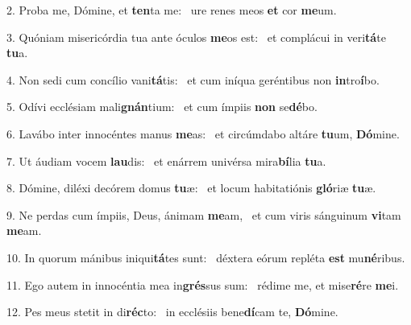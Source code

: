 2. Proba me, Dómine, et \textbf{ten}ta me: \ast\  ure renes meos \textbf{et} cor \textbf{me}um.\

3. Quóniam misericórdia tua ante óculos \textbf{me}os est: \ast\  et complácui in veri\textbf{tá}te \textbf{tu}a.\

4. Non sedi cum concílio vani\textbf{tá}tis: \ast\  et cum iníqua geréntibus non \textbf{in}tro\textbf{í}bo.\

5. Odívi ecclésiam mali\textbf{gnán}tium: \ast\  et cum ímpiis \textbf{non} se\textbf{dé}bo.\

6. Lavábo inter innocéntes manus \textbf{me}as: \ast\  et circúmdabo altáre \textbf{tu}um, \textbf{Dó}mine.\

7. Ut áudiam vocem \textbf{lau}dis: \ast\  et enárrem univérsa mira\textbf{bí}lia \textbf{tu}a.\

8. Dómine, diléxi decórem domus \textbf{tu}æ: \ast\  et locum habitatiónis \textbf{gló}riæ \textbf{tu}æ.\

9. Ne perdas cum ímpiis, Deus, ánimam \textbf{me}am, \ast\  et cum viris sánguinum \textbf{vi}tam \textbf{me}am.\

10. In quorum mánibus iniqui\textbf{tá}tes sunt: \ast\  déxtera eórum repléta \textbf{est} mu\textbf{né}ribus.\

11. Ego autem in innocéntia mea in\textbf{grés}sus sum: \ast\  rédime me, et mise\textbf{ré}re \textbf{me}i.\

12. Pes meus stetit in di\textbf{réc}to: \ast\  in ecclésiis bene\textbf{dí}cam te, \textbf{Dó}mine.\

